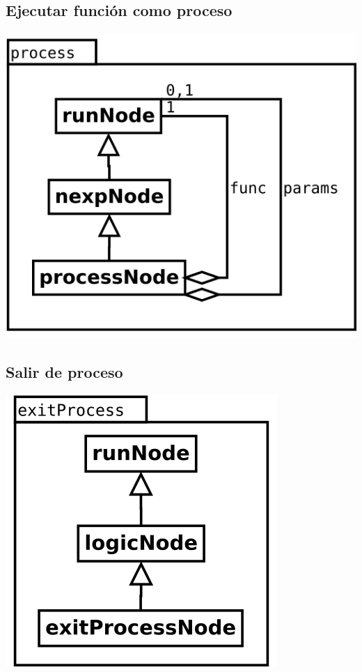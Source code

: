 \subsection {Ejecutar función como proceso} 
\begin{center}
\includegraphics[scale=0.4]{process.png} \\
\end{center}

\subsection {Salir de proceso} 
\begin{center}
\includegraphics[scale=0.4]{exitProcess.png} \\
\end{center}

